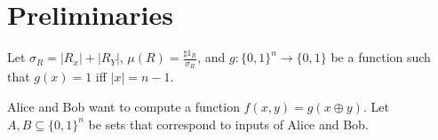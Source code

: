 \section{Preliminaries}

Let $\sigma_{R} = |R_x| + |R_Y|$,
$\mu(R) = \frac{\sharp 1_R}{\sigma_R}$, and $g: \{0, 1\}^n \to \{0, 1\}$ be a function such that $g(x) =
1$ iff $|x| = n - 1$.

Alice and Bob want to compute a function $f(x, y) = g(x \oplus y)$. Let $A, B \subseteq \{0, 1\}^{n}$ be
sets that correspond to inputs of Alice and Bob.

